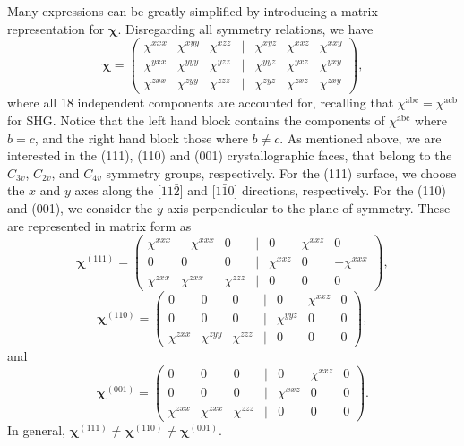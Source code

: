 \documentclass[aps,pra,10pt,amsmath,notitlepage,letterpaper]{revtex4-1}
\begin{document}
Many expressions can be greatly simplified by introducing a matrix
representation for $\boldsymbol{\chi}$. Disregarding all symmetry relations, we
have
\begin{equation}
\boldsymbol{\chi} =
\begin{pmatrix}
\chi^{xxx}&\chi^{xyy}&\chi^{xzz} &|& \chi^{xyz}&\chi^{xxz}&\chi^{xxy} \\[3pt]
\chi^{yxx}&\chi^{yyy}&\chi^{yzz} &|& \chi^{yyz}&\chi^{yxz}&\chi^{yxy} \\[3pt]
\chi^{zxx}&\chi^{zyy}&\chi^{zzz} &|& \chi^{zyz}&\chi^{zxz}&\chi^{zxy}
\end{pmatrix}
,
\end{equation}
where all 18 independent components are accounted for, recalling that
$\chi^{\mathrm{abc}} = \chi^{\mathrm{acb}}$ for SHG. Notice that the left hand
block contains the components of $\chi^{\mathrm{abc}}$ where $b = c$, and the
right hand block those where $b \neq c$. As mentioned above, we are interested
in the (111), (110) and (001) crystallographic faces, that belong to the
$C_{3v}$, $C_{2v}$, and $C_{4v}$ symmetry groups, respectively. For the (111)
surface, we choose the $x$ and $y$ axes along the [$11\bar{2}$] and
[$1\bar{1}0$] directions, respectively. For the (110) and (001), we consider the
$y$ axis perpendicular to the plane of symmetry.\cite{sipePRB87} These are
represented in matrix form as
\begin{equation}\label{eq:111matrix}
\boldsymbol{\chi}^{(111)} =
\begin{pmatrix}
\chi^{xxx}&-\chi^{xxx}&    0      &|&     0     &\chi^{xxz}&     0     \\[3pt]
     0    &      0    &    0      &|& \chi^{xxz}&     0   &-\chi^{xxx}\\[3pt]
\chi^{zxx}& \chi^{zxx}&\chi^{zzz} &|&     0     &     0    &     0 
\end{pmatrix}
,
\end{equation}
\begin{equation}\label{eq:110matrix}
\boldsymbol{\chi}^{(110)} =
\begin{pmatrix}
     0    &     0    &     0     &|&      0    &\chi^{xxz}&     0     \\[3pt]
     0    &     0    &     0     &|& \chi^{yyz}&     0    &     0     \\[3pt]
\chi^{zxx}&\chi^{zyy}&\chi^{zzz} &|&      0    &     0    &     0
\end{pmatrix}
,
\end{equation}
and
\begin{equation}\label{eq:001matrix}
\boldsymbol{\chi}^{(001)} =
\begin{pmatrix}
     0    &     0    &     0     &|&      0    &\chi^{xxz}&     0     \\[3pt]
     0    &     0    &     0     &|& \chi^{xxz}&     0    &     0     \\[3pt]
\chi^{zxx}&\chi^{zxx}&\chi^{zzz} &|&      0    &     0    &     0
\end{pmatrix}
.
\end{equation}
In general, $\boldsymbol{\chi}^{(111)}\ne \boldsymbol{\chi}^{(110)} \ne 
\boldsymbol{\chi}^{(001)}$.
\end{document}
